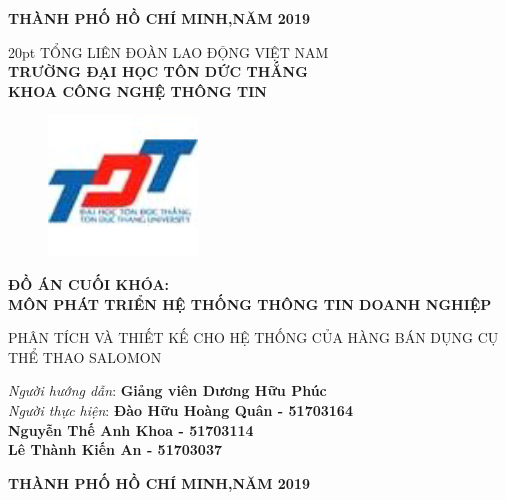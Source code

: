 \documentclass{article}
\begin{document}
    \vspace{3cm}
    \begin{center}
     \fontsize{14}{20}\selectfont
   \textbf{THÀNH PHỐ HỒ CHÍ MINH,NĂM 2019}
\end{center}
\begin{center}
    \fontsize{14pt} {20pt}\selectfont
    \textsc{TỔNG LIÊN ĐOÀN LAO ĐỘNG VIỆT NAM\\}
    \textbf{TRƯỜNG ĐẠI HỌC TÔN DỨC THẮNG\\}
    \textbf{KHOA CÔNG NGHỆ THÔNG TIN\\}
    \vspace{1 cm}
    
        \begin{figure}[htp]
            \centering
           \includegraphics{2.jpg}
        \end{figure}
     
     
     
    \fontsize{16}{20}\selectfont\textbf{ĐỒ ÁN CUỐI KHÓA:\\}
    \fontsize{16}{20}\selectfont\textbf{MÔN PHÁT TRIỂN HỆ THỐNG THÔNG TIN DOANH NGHIỆP\\}
    \vspace{0.5CM}
    
    \fontsize{24}{20}\selectfont\textsc{PHÂN TÍCH VÀ THIẾT KẾ CHO HỆ THỐNG CỦA HÀNG BÁN DỤNG CỤ THỂ THAO SALOMON \\}
    \end{center}
    \vspace{2cm}
    \begin{flushright}
        \fontsize{14}{20}\selectfont
        \textit{Người hướng dẫn}: \textbf{Giảng viên Dương Hữu Phúc}\\
        \textit{Người thực hiện}: \textbf{Đào Hữu Hoàng Quân - 51703164}\\
        \textbf{Nguyễn Thế Anh Khoa - 51703114}\\
         \textbf{Lê Thành Kiến An - 51703037}\\
    \end{flushright}
    \vspace{3cm}
    \begin{center}
     \fontsize{14}{20}\selectfont
   \textbf{THÀNH PHỐ HỒ CHÍ MINH,NĂM 2019}
\end{center}
\end{document}
